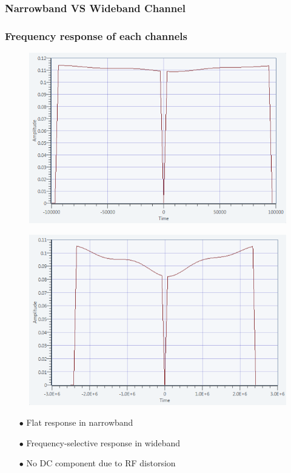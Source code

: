 \documentclass[11pt]{beamer}
\begin{document}
\subsubsection{Narrowband VS Wideband Channel}
\begin{frame}
\frametitle{Frequency response of each channels}

\begin{figure}[!ht]
    \begin{minipage}[b]{0.48\linewidth}
        \centering \includegraphics[scale=0.33]{img/channel_response_narrow.png}
     \label{fig2}
    \end{minipage}\hfill
    \begin{minipage}[b]{0.48\linewidth}
         \centering \includegraphics[scale=0.33]{img/channel_response_wideband.png}
    \end{minipage}
\end{figure}
\begin{itemize}
\item[$\bullet$] Flat response in narrowband
\item[$\bullet$] Frequency-selective response in wideband 
\item[$\bullet$] No DC component due to RF distorsion
\end{itemize}

\end{frame}
\end{document}

